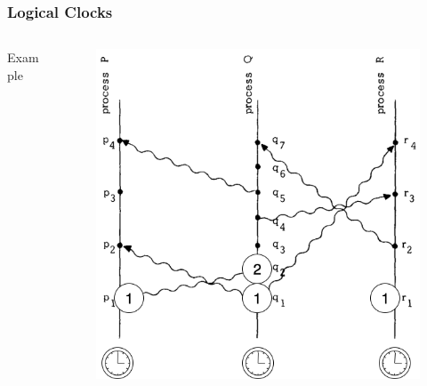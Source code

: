\documentclass{beamer}
\begin{document}
\frame
{
	\frametitle{Logical Clocks}

	\begin{columns}
	\begin{column}{0.6\textwidth}

		Example


	\end{column}
	\begin{column}{0.4\textwidth}

		\begin{figure}[ht!]
		\includegraphics[width=\textwidth]{files/ClockDist-Impl-Logical-Clock-1.png}
		\end{figure}


	\end{column}
	\end{columns}
}
\end{document}
